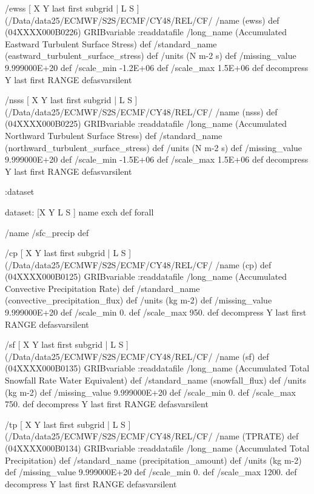\begin{ingrid}
/ewss { [ X Y last first subgrid | L S ] (/Data/data25/ECMWF/S2S/ECMF/CY48/REL/CF/%
/name (ewss) def
(04XXXX000B0226) GRIBvariable
:readdatafile
/long_name (Accumulated Eastward Turbulent Surface Stress) def
/standard_name (eastward_turbulent_surface_stress) def
/units (N m-2 s) def
/missing_value 9.999000E+20 def
/scale_min -1.2E+06 def
/scale_max 1.5E+06 def
decompress
Y last first RANGE
} defasvarsilent

/nsss { [ X Y last first subgrid | L S ] (/Data/data25/ECMWF/S2S/ECMF/CY48/REL/CF/%
/name (nsss) def
(04XXXX000B0225) GRIBvariable
:readdatafile
/long_name (Accumulated Northward Turbulent Surface Stress) def
/standard_name (northward_turbulent_surface_stress) def
/units (N m-2 s) def
/missing_value 9.999000E+20 def
/scale_min -1.5E+06 def
/scale_max 1.5E+06 def
decompress
Y last first RANGE
} defasvarsilent

:dataset

dataset:
[X Y L S ] {name exch def } forall

/name /sfc_precip def

/cp { [ X Y last first subgrid | L S ] (/Data/data25/ECMWF/S2S/ECMF/CY48/REL/CF/%
/name (cp) def
(04XXXX000B0125) GRIBvariable
:readdatafile
/long_name (Accumulated Convective Precipitation Rate) def
/standard_name (convective_precipitation_flux) def
/units (kg m-2) def
/missing_value 9.999000E+20 def
/scale_min 0. def
/scale_max 950. def
decompress
Y last first RANGE
} defasvarsilent

/sf { [ X Y last first subgrid | L S ] (/Data/data25/ECMWF/S2S/ECMF/CY48/REL/CF/%
/name (sf) def
(04XXXX000B0135) GRIBvariable
:readdatafile
/long_name (Accumulated Total Snowfall Rate Water Equivalent) def
/standard_name (snowfall_flux) def
/units (kg m-2) def
/missing_value 9.999000E+20 def
/scale_min 0. def
/scale_max 750. def
decompress
Y last first RANGE
} defasvarsilent

/tp { [ X Y last first subgrid | L S ] (/Data/data25/ECMWF/S2S/ECMF/CY48/REL/CF/%
/name (TPRATE) def
(04XXXX000B0134) GRIBvariable
:readdatafile
/long_name (Accumulated Total Precipitation) def
/standard_name (precipitation_amount) def 
/units (kg m-2) def
/missing_value 9.999000E+20 def
/scale_min 0. def
/scale_max 1200. def
decompress
Y last first RANGE
} defasvarsilent


\end{ingrid}
